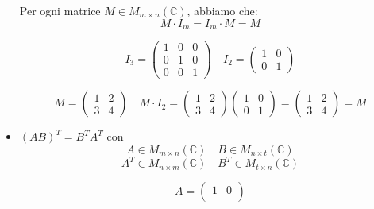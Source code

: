 \documentclass[a4paper]{article}
\theoremstyle{break}
\theoremstyle{break}
\theoremstyle{break}
\theoremstyle{break}
\begin{document}
\begin{itemize}
      Per ogni matrice \( M \in M_{m \times n}(\mathbb{C}) \), abbiamo che:
      \[ M \cdot I_m = I_m \cdot M =  M \]
      \begin{figure}[H]
        \begin{example}
          \[
          I_3 = \begin{pmatrix} 
            1 & 0 & 0\\
            0 & 1 & 0\\
            0 & 0 & 1
          \end{pmatrix}
          \quad
          I_2 = \begin{pmatrix} 
            1 & 0\\
            0 & 1
          \end{pmatrix}
          \] 
        \end{example}
      \end{figure}
      \begin{figure}[H]
        \begin{example}
          \[
          M = \begin{pmatrix} 
            1 & 2\\
            3 & 4
          \end{pmatrix}
          \quad
          M \cdot I_2 = \begin{pmatrix} 
            1 & 2\\
            3 & 4
          \end{pmatrix}
          \begin{pmatrix} 
            1 & 0 \\
            0 & 1
          \end{pmatrix} 
          =
          \begin{pmatrix} 
            1 & 2\\
            3 & 4
          \end{pmatrix}
          = M
          \] 
        \end{example}
      \end{figure}
    \item \( (AB)^T = B^T A^T \) con \[ A \in M_{m \times n}(\mathbb{C}) \quad
        B \in M_{n \times t}(\mathbb{C}) \]
        \[
        A^T \in M_{n \times m}(\mathbb{C}) \quad
        B^T \in M_{t \times n}(\mathbb{C})
        \] 
        \begin{figure}[H]
          \begin{example}
            \[
              A = \begin{pmatrix}
                1 & 0\\

\end{pmatrix}\]
\end{example}
\end{figure}
\end{itemize}
\end{document}
